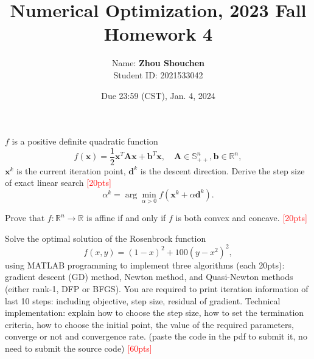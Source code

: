 \documentclass[10pt]{article}
\newenvironment{problem}[2][Problem]{\begin{trivlist}
\item[\hskip \labelsep {\bfseries #1}\hskip \labelsep {\bfseries #2.}]}{\end{trivlist}}
\begin{document}
\title{	Numerical Optimization, 2023 Fall\\Homework 4}
\date{Due 23:59 (CST), Jan. 4, 2024 }

\author{
    Name: \textbf{Zhou Shouchen} \\
	Student ID: 2021533042
}

\maketitle
\newpage


\begin{problem}{1}
    $f$ is a positive definite quadratic function $$f(\pmb x) = \frac{1}{2}\pmb x^T\pmb A\pmb x + \pmb b^T\pmb x,  \quad \pmb A \in \mathbb{S}_{++}^n, \pmb b \in \mathbb{R}^n,$$ $\pmb x^k$ is the current iteration point, $\pmb d^k$ is the descent direction. Derive the step size of exact linear search \textcolor{red}{[20pts]} $$\alpha^k = \arg\min_{\alpha > 0}f(\pmb x^k + \alpha \pmb d^k).$$
\end{problem}




\newpage

\begin{problem}{2}
    Prove that $f: \mathbb{R}^n \rightarrow \mathbb{R}$ is affine if and only if $f$ is both convex and concave. \textcolor{red}{[20pts]} 
\end{problem}



\newpage

\begin{problem}{3}
    Solve the optimal solution of the Rosenbrock function $$f(x, y) = (1 - x)^2 + 100(y - x^2)^2, $$ using MATLAB programming to implement three algorithms (each 20pts): gradient descent (GD) method, Newton method, and Quasi-Newton methods (either rank-1, DFP or BFGS). You are required to print iteration information of last 10 steps: including objective, step size, residual of gradient. Technical implementation: explain how to choose the step size, how to set the termination criteria, how to choose the initial point, the value of the required parameters, converge or not and convergence rate. (paste the code in the pdf to submit it, no need to submit the source code) \textcolor{red}{[60pts]}
\end{problem}
\end{document}

